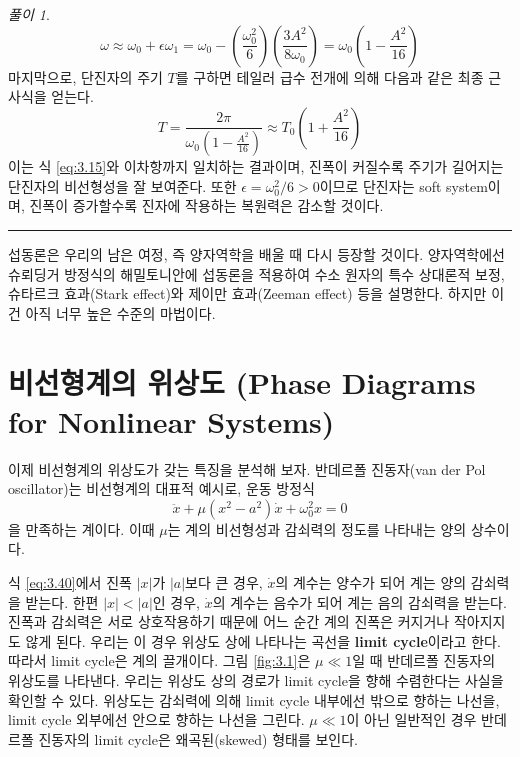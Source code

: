 \documentclass[chapter, oneside, b5paper]{oblivoir}
\theoremstyle{plain}
\theoremstyle{definition}
\theoremstyle{remark}
\newtheorem*{solution}{풀이}
\begin{document}
\begin{solution}
    \begin{equation}
        \omega \approx \omega_0 + \epsilon\omega_1 = \omega_0 - \left(\frac{\omega_0^2}{6}\right)\left(\frac{3A^2}{8\omega_0}\right) = \omega_0\left(1 - \frac{A^2}{16}\right)
        \label{eq:3.38}
    \end{equation}
    마지막으로, 단진자의 주기 $T$를 구하면 테일러 급수 전개에 의해 다음과 같은 최종 근사식을 얻는다.
    \begin{equation}
        T = \frac{2\pi}{\omega_0\left(1 - \frac{A^2}{16}\right)} \approx T_0 \left(1 + \frac{A^2}{16}\right)
    \end{equation}
    이는 식 \ref{eq:3.15}와 이차항까지 일치하는 결과이며, 진폭이 커질수록 주기가 길어지는 단진자의 비선형성을 잘 보여준다. 또한 $\epsilon = \omega_0^2/6 > 0$이므로 단진자는 soft system이며, 진폭이 증가할수록 진자에 작용하는 복원력은 감소할 것이다.
\end{solution}


\noindent\rule{\textwidth}{0.8pt} %
\vspace{1em} %

섭동론은 우리의 남은 여정, 즉 양자역학을 배울 때 다시 등장할 것이다. 양자역학에선 슈뢰딩거 방정식의 해밀토니안에 섭동론을 적용하여 수소 원자의 특수 상대론적 보정, 슈타르크 효과(Stark effect)와 제이만 효과(Zeeman effect) 등을 설명한다. 하지만 이건 아직 너무 높은 수준의 마법이다.

\section{비선형계의 위상도 (Phase Diagrams for Nonlinear Systems)}
이제 비선형계의 위상도가 갖는 특징을 분석해 보자. 반데르폴 진동자(van der Pol oscillator)는 비선형계의 대표적 예시로, 운동 방정식
\begin{equation}
    \ddot{x} + \mu (x^2 - a^2)\dot{x} + \omega_0 ^2 x = 0 \label{eq:3.40}
\end{equation}
을 만족하는 계이다. 이때 $\mu$는 계의 비선형성과 감쇠력의 정도를 나타내는 양의 상수이다.

식 \ref{eq:3.40}에서 진폭 $|x|$가 $|a|$보다 큰 경우, $\dot{x}$의 계수는 양수가 되어 계는 양의 감쇠력을 받는다. 한편 $|x|<|a|$인 경우, $\dot{x}$의 계수는 음수가 되어 계는 음의 감쇠력을 받는다. 진폭과 감쇠력은 서로 상호작용하기 때문에 어느 순간 계의 진폭은 커지거나 작아지지도 않게 된다. 우리는 이 경우 위상도 상에 나타나는 곡선을 \textbf{limit cycle}이라고 한다. 따라서 limit cycle은 계의 끌개이다. 그림 \ref{fig:3.1}은 $\mu \ll 1$일 때 반데르폴 진동자의 위상도를 나타낸다. 우리는 위상도 상의 경로가 limit cycle을 향해 수렴한다는 사실을 확인할 수 있다. 위상도는 감쇠력에 의해 limit cycle 내부에선 밖으로 향하는 나선을, limit cycle 외부에선 안으로 향하는 나선을 그린다. $\mu \ll 1$이 아닌 일반적인 경우 반데르폴 진동자의 limit cycle은 왜곡된(skewed) 형태를 보인다.
\end{document}
